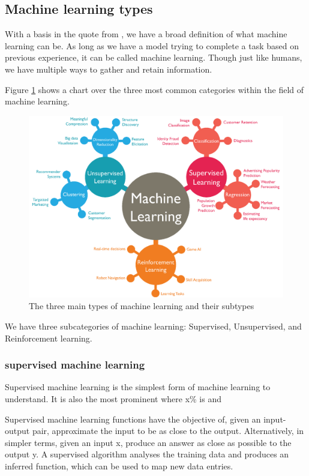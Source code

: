 \subsection{Machine learning types}
With a basis in the quote from \cite{MitchellTomM1997Ml} , we have a broad definition of what machine learning can be.
As long as we have a model trying to complete a task based on previous experience, it can be called machine learning. Though just like humans, we have multiple ways to gather and retain information.

Figure \ref{fig:ML_types} shows a chart over the three most common categories within the field of machine learning. 

    \begin{figure}[h]
        \centering
        \includegraphics[scale=0.3]{background/figures/ML_types.png}
        \caption{The three main types of machine learning and their subtypes}
    \label{fig:ML_types} 
    \end{figure}

We have three subcategories of machine learning: Supervised, Unsupervised, and Reinforcement learning. 

\subsubsection{supervised machine learning}
Supervised machine learning is the simplest form of machine learning to understand. It is also the most prominent where x\% is and 

Supervised machine learning functions have the objective of, given an input-output pair, approximate the input to be as close to the output.  
Alternatively, in simpler terms, given an input x, produce an answer as close as possible to the output y.
A supervised algorithm analyses the training data and produces an inferred function, which can be used to map new data entries. 

